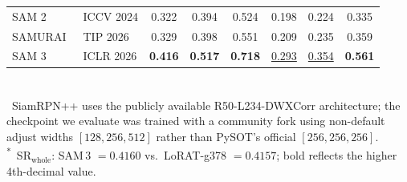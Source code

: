 \begin{table}[t]
{\begin{tabular}{l l ccc ccc}
SAM 2~\cite{ravi2024sam}           & ICCV 2024  & 0.322             & 0.394             & 0.524             & 0.198             & 0.224             & 0.335             \\
SAMURAI~\cite{yang2026samurai}     & TIP 2026   & 0.329             & 0.398             & 0.551             & 0.209             & 0.235             & 0.359             \\
SAM 3~\cite{carion2026sam3}        & ICLR 2026  & \textbf{0.416}    & \textbf{0.517}    & \textbf{0.718}    & \underline{0.293} & \underline{0.354} & \textbf{0.561}    \\
\bottomrule
\end{tabular}
}
\\[2pt]
{\footnotesize \textsuperscript{\dag}~SiamRPN++ uses the publicly available R50-L234-DWXCorr architecture; the checkpoint we evaluate was trained with a community fork using non-default adjust widths $[128, 256, 512]$ rather than PySOT's official $[256, 256, 256]$.\\
\textsuperscript{*}~SR$_{\text{whole}}$: SAM\,3 $=0.4160$ vs.\ LoRAT-g378 $=0.4157$; bold reflects the higher 4th-decimal value.}
\end{table}
